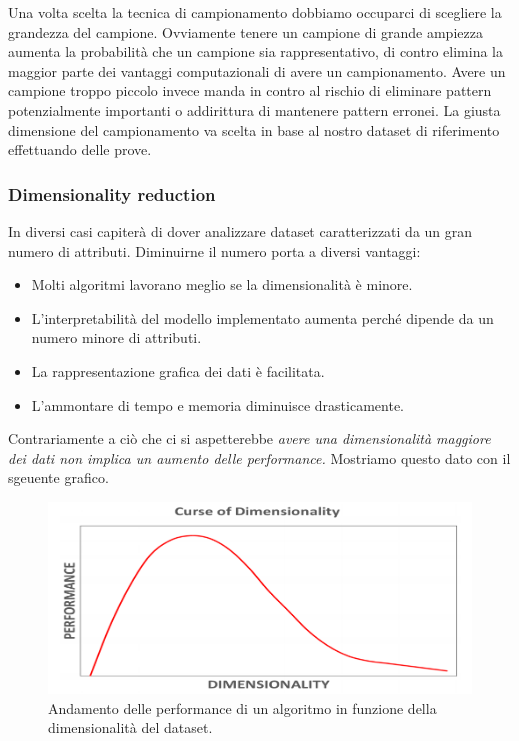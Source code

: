 Una volta scelta la tecnica di campionamento dobbiamo occuparci di scegliere la grandezza del campione. Ovviamente tenere un campione di grande ampiezza aumenta la probabilità che un campione sia rappresentativo, di contro elimina la maggior parte dei vantaggi computazionali di avere un campionamento. Avere un campione troppo piccolo invece manda in contro al rischio di eliminare pattern potenzialmente importanti o addirittura di mantenere pattern erronei. La giusta dimensione del campionamento va scelta in base al nostro dataset di riferimento effettuando delle prove.

\subsubsection{Dimensionality reduction}

In diversi casi capiterà di dover analizzare dataset caratterizzati da un gran numero di attributi. Diminuirne il numero porta a diversi vantaggi:


\begin{itemize}
	\item Molti algoritmi lavorano meglio se la dimensionalità è minore.
	\item L'interpretabilità del modello implementato aumenta perché dipende da un numero minore di attributi.
	\item La rappresentazione grafica dei dati è facilitata.
	\item L'ammontare di tempo e memoria diminuisce drasticamente.
\end{itemize}

Contrariamente a ciò che ci si aspetterebbe \textit{avere una dimensionalità maggiore dei dati non implica un aumento delle performance.}
Mostriamo questo dato con il sgeuente grafico.

\begin{figure}[H]
	\centering
	\includegraphics[height=0.35 \linewidth]{introduction/pict/performance.png}
	\caption{Andamento delle performance di un algoritmo in funzione della dimensionalità del dataset.}
\end{figure}

